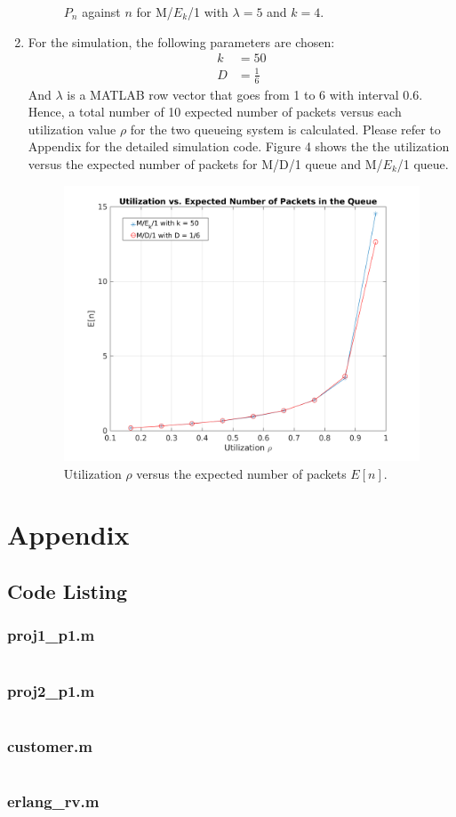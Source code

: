 \documentclass{article}
\begin{document}
\begin{enumerate}
\begin{figure}[!hbt]
				\caption{$P_n$ against $n$ for M/$E_k$/1 with $\lambda = 5$ and $k = 4$.}
			\end{figure}
		\item For the simulation, the following parameters are chosen:
			\begin{align*}
				k &= 50 \\
				D &= \frac{1}{6}
			\end{align*}
			And $\lambda$ is a MATLAB row vector that goes from 1 to 6 with interval
			0.6. Hence, a total number of 10 expected number of packets versus each
			utilization value $\rho$ for the two queueing system is calculated.
			Please refer to Appendix for the detailed simulation code. Figure 4 shows
			the the utilization versus the expected number of packets for M/D/1 queue
			and M/$E_k$/1 queue.
			\begin{figure}[!hbt]
				\centering
				\includegraphics[width=0.7\linewidth]{proj1_p2_en.png}
				\caption{Utilization $\rho$ versus the expected number of packets $E[n]$.}
			\end{figure}
	\end{enumerate}

\section*{Appendix}
	\subsection*{Code Listing}
		\subsubsection*{proj1\_p1.m}
			\inputminted[tabsize=2,breaklines]{matlab}{proj1_p1.m}
		\pagebreak
		\subsubsection*{proj2\_p1.m}
			\inputminted[tabsize=2,breaklines]{matlab}{proj1_p2.m}
		\pagebreak
		\subsubsection*{customer.m}
			\inputminted[tabsize=2,breaklines]{matlab}{customer.m}
		\pagebreak
		\subsubsection*{erlang\_rv.m}
			\inputminted[tabsize=2,breaklines]{matlab}{erlang_rv.m}
\end{document}
